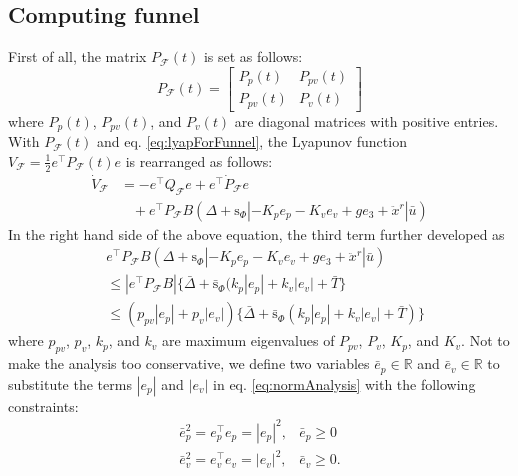 \documentclass[letterpaper, 10 pt, conference]{ieeeconf}  %
\begin{document}
\subsection{Computing funnel}
First of all, the matrix $P_\mathcal{F}(t)$ is set as follows:
\begin{equation}
P_\mathcal{F}(t) = \left[
\begin{array}{cc}
P_p(t) & P_{pv}(t) \\
P_{pv}(t) & P_v(t)
\end{array}
\right] \nonumber
\end{equation}
where $P_p(t)$, $P_{pv}(t)$, and $P_v(t)$ are diagonal matrices with positive entries.
With $P_\mathcal{F}(t)$ and eq. \eqref{eq:lyapForFunnel}, the Lyapunov function $V_\mathcal{F} = \frac{1}{2}e^\intercal P_\mathcal{F}(t) e$ is rearranged as follows: 
\begin{align}
\dot{V}_\mathcal{F} &= -e^\intercal Q_\mathcal{F} e + e^\intercal \dot{P}_\mathcal{F} e\nonumber \\
&\;\;\;+e^\intercal P_\mathcal{F} B(\Delta+\text{s}_\Phi|-K_pe_p -K_ve_v + ge_3 + \ddot{x}^r|\bar{u}) \nonumber
\end{align}
In the right hand side of the above equation, the third term further developed as
\begin{align}
&e^\intercal P_\mathcal{F} B(\Delta+\text{s}_\Phi|-K_p e_p -K_v e_v + ge_3 + \ddot{x}^r|\bar{u}) \nonumber \\
&\leq |e^\intercal P_\mathcal{F}B|\{\bar{\Delta} + \bar{\text{s}}_\Phi(k_p|e_p| + k_v|e_v| + \bar{T}\} \nonumber \\
&\leq (p_{pv}|e_p|+p_v|e_v|)\{\bar{\Delta}+\bar{\text{s}}_\Phi(k_p|e_p|+k_v|e_v|+\bar{T})\} \label{eq:normAnalysis}
\end{align}
where $p_{pv}$, $p_v$, $k_p$, and $k_v$ are maximum eigenvalues of $P_{pv}$, $P_v$, $K_p$, and $K_v$.
Not to make the analysis too conservative, 
we define two variables $\bar{e}_p\in\mathbb{R}$ and $\bar{e}_v\in\mathbb{R}$ to substitute the terms $|e_p|$ and $|e_v|$ in eq. \eqref{eq:normAnalysis} with the following constraints:
\begin{equation}
\begin{array}{ll}
\bar{e}_p^2 = e_p^\intercal e_p = |e_p|^2, & \bar{e}_p \geq 0 \\
\bar{e}_v^2 = e_v^\intercal e_v = |e_v|^2, & \bar{e}_v \geq 0. \\
\end{array} \label{eq:ebarConst} 
\end{equation} 
\end{document}

